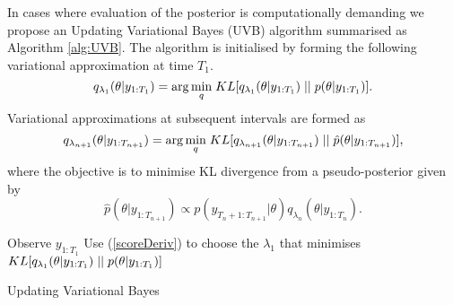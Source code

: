 \documentclass[12pt,a4paper]{article}\usepackage[]{graphicx}\usepackage[]{color}
\begin{document}
{In cases where evaluation of the posterior is computationally demanding we propose an Updating Variational Bayes (UVB) algorithm summarised as Algorithm \ref{alg:UVB}.  The algorithm is initialised by forming the following variational approximation at time $T_1$.
\begin{equation}
\label{UVB:Time1}
q_{\lambda_1}(\theta | y_{1:T_1}) = \arg \underset{q}{\min} \hspace{1mm} KL[q_{\lambda_1} (\theta | y_{1:T_1}) \hspace{.1cm}||\hspace{.1cm}p(\theta | y_{1:T_1})].
\end{equation}
Variational approximations at subsequent intervals are formed as
\begin{equation}
\label{UVB:TimeNp1}
q_{\lambda_{n+1}}(\theta | y_{1:T_{n+1}}) = \arg \underset{q}{\min} \hspace{1mm} KL[q_{\lambda_{n+1}} (\theta | y_{1:T_{n+1}}) \hspace{.1cm}||\hspace{.1cm}\hat{p}(\theta | y_{1:T_{n+1}})],
\end{equation}
where the objective is to minimise KL divergence from a pseudo-posterior given by
\begin{equation}
\label{UVB:pHatPosterior}
\hat{p}(\theta |  y_{1:T_{n+1}}) \propto p(y_{T_{n}+1:T_{n+1}} | \theta)q_{\lambda_{n}}(\theta | y_{1:T_{n}}).
\end{equation}

\begin{algorithm}[H]
 Observe $y_{1:T_1}$\;
 Use (\ref{scoreDeriv}) to choose the $\lambda_1$ that minimises $KL[q_{\lambda_1}(\theta |y_{1:T_1})\hspace{.1cm}||\hspace{.1cm}p(\theta |y_{1:T_1})]$\;
 \caption{Updating Variational Bayes}
  \label{alg:UVB}
\end{algorithm}

}
\end{document}
